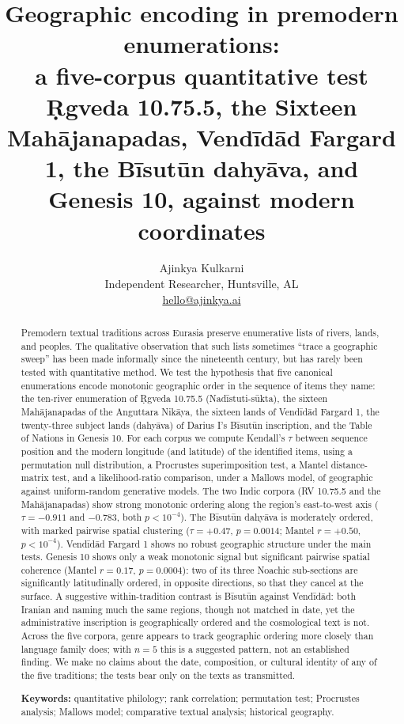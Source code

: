 \documentclass[11pt]{article}
\title{\bfseries Geographic encoding in premodern enumerations:\\
       a five-corpus quantitative test\\[2pt]
       \large\mdseries Ṛgveda 10.75.5, the Sixteen Mahājanapadas, Vendīdād
       Fargard 1, the Bīsutūn dahyāva, and Genesis 10, against modern
       coordinates}
\author{
  Ajinkya Kulkarni\\
  Independent Researcher, Huntsville, AL\\
  \href{mailto:hello@ajinkya.ai}{hello@ajinkya.ai}
}
\date{}
\begin{document}
\maketitle
\thispagestyle{fancy}

\begin{abstract}
\noindent
Premodern textual traditions across Eurasia preserve enumerative lists
of rivers, lands, and peoples. The qualitative observation that such
lists sometimes ``trace a geographic sweep'' has been made informally
since the nineteenth century, but has rarely been tested with
quantitative method. We test the hypothesis that five canonical
enumerations encode monotonic geographic order in the sequence of
items they name: the ten-river enumeration of Ṛgveda 10.75.5
(Nadīstuti-sūkta), the sixteen Mahājanapadas of the Anguttara
Nikāya, the sixteen lands of Vendīdād Fargard 1, the twenty-three
subject lands (dahyāva) of Darius I's Bīsutūn inscription, and
the Table of Nations in Genesis 10. For each corpus we compute
Kendall's $\tau$ between sequence position and the modern longitude
(and latitude) of the identified items, using a permutation null
distribution, a Procrustes superimposition test, a Mantel
distance-matrix test, and a likelihood-ratio comparison, under a
Mallows model, of geographic against uniform-random generative
models. The two Indic
corpora (RV 10.75.5 and the Mahājanapadas) show strong monotonic
ordering along the region's east-to-west axis ($\tau = -0.911$ and
$-0.783$, both $p<10^{-4}$). The Bīsutūn dahyāva is moderately
ordered, with marked pairwise spatial clustering ($\tau = +0.47$,
$p = 0.0014$; Mantel $r = +0.50$, $p<10^{-4}$). Vendīdād Fargard 1
shows no robust geographic structure under the main tests. Genesis 10
shows only a weak monotonic signal but significant pairwise spatial
coherence (Mantel $r=0.17$, $p=0.0004$): two of its three Noachic
sub-sections are significantly latitudinally ordered, in opposite
directions, so that they cancel at the surface. A suggestive
within-tradition contrast is Bīsutūn against Vendīdād: both Iranian
and naming much the same regions, though not matched in date, yet the
administrative inscription is geographically ordered and the
cosmological text is not. Across the five corpora, genre appears to
track geographic ordering more closely than language family does;
with $n=5$ this is a suggested pattern, not an established finding. We make no claims about the
date, composition, or cultural identity of any of the five
traditions; the tests bear only on the texts as transmitted.
\medskip

\noindent\textbf{Keywords:} quantitative philology; rank correlation;
permutation test; Procrustes analysis; Mallows model; comparative
textual analysis; historical geography.
\end{abstract}
\end{document}
